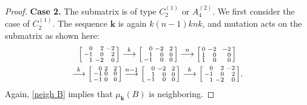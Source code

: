 \documentclass{amsart}
\theoremstyle{definition}
\theoremstyle{remark}
\numberwithin{equation}{section}
\newcommand{\0}{{\mathbf{0}}}
\newcommand{\kk}{\mathbf{k}}
\begin{document}
\begin{proof}
\noindent
\textbf{Case 2.}
The submatrix is of type $C_2^{(1)}$ or $A_4^{(2)}$.
We first consider the case of $C_2^{(1)}$.
The sequence $\kk$ is again $k(n-1)knk$, and mutation acts on the submatrix as shown here:
\begin{multline*}
\begin{bsmallmatrix*}[r]
0&2&-2\\
-1&0&2\\
1&-2&0
\end{bsmallmatrix*}
\overset{k}{\longrightarrow}
\begin{bsmallmatrix*}[r]
0&-2&\,\,\,2\\
1&0&0\\
-1&0&0
\end{bsmallmatrix*}
\overset{n}{\longrightarrow}
\begin{bsmallmatrix*}[r]
0&-2&\,\,\,-2\\
1&0&0\\
1&0&0
\end{bsmallmatrix*}\\
\overset{k}{\longrightarrow}
\begin{bsmallmatrix*}[r]
0&2&\,\,\,2\\
-1&0&0\\
-1&0&0
\end{bsmallmatrix*}
\overset{n-1}{\longrightarrow}
\begin{bsmallmatrix*}[r]
0&-2&\,\,\,2\\
1&0&0\\
-1&0&0
\end{bsmallmatrix*}
\overset{k}{\longrightarrow}
\begin{bsmallmatrix*}[r]
0&2&-2\\
-1&0&2\\
1&-2&0
\end{bsmallmatrix*}.
\end{multline*}
Again, \cref{neigh B} implies that $\mu_\kk(B)$ is neighboring.


\end{proof}
\end{document}
